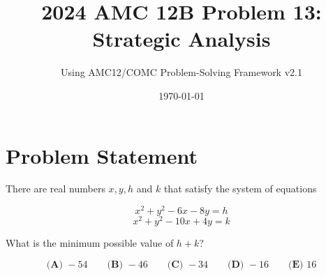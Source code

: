 \documentclass[12pt]{article}
\title{\textbf{2024 AMC 12B Problem 13:\\Strategic Analysis}}
\author{Using AMC12/COMC Problem-Solving Framework v2.1}
\date{\today}
\begin{document}
\maketitle

\section*{Problem Statement}

There are real numbers $x, y, h$ and $k$ that satisfy the system of equations

\[x^2 + y^2 - 6x - 8y = h\]
\[x^2 + y^2 - 10x + 4y = k\]

What is the minimum possible value of $h+k$?

\[
\textbf{(A) } -54 \qquad 
\textbf{(B) } -46 \qquad 
\textbf{(C) } -34 \qquad 
\textbf{(D) } -16 \qquad 
\textbf{(E) } 16
\]

\vspace{1em}
\end{document}
